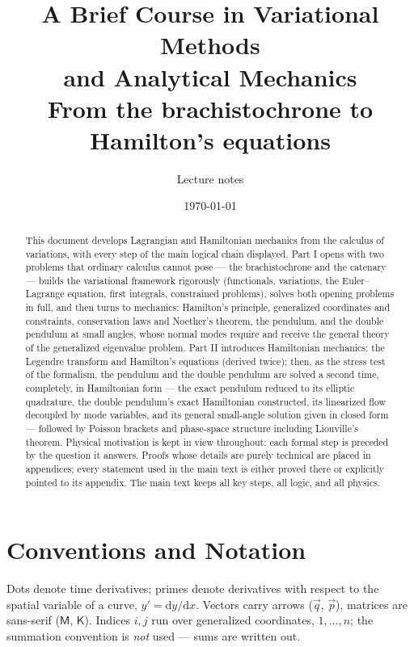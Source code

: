 \documentclass[11pt]{article}
\title{\bfseries A Brief Course in Variational Methods\\
and Analytical Mechanics\\[4pt]
\large From the brachistochrone to Hamilton's equations}
\author{Lecture notes}
\date{\today}
\theoremstyle{plain}
\theoremstyle{definition}
\theoremstyle{remark}
\newcommand{\dd}{\mathrm{d}}
\newcommand{\vq}{\vec{q}}
\newcommand{\vp}{\vec{p}}
\newcommand{\mM}{\mathsf{M}}
\newcommand{\mK}{\mathsf{K}}
\begin{document}
\maketitle

\begin{abstract}
\noindent
This document develops Lagrangian and Hamiltonian mechanics from the
calculus of variations, with every step of the main logical chain displayed.
Part I opens with two problems that ordinary calculus cannot pose --- the
brachistochrone and the catenary --- builds the variational framework
rigorously (functionals, variations, the Euler--Lagrange equation, first
integrals, constrained problems), solves both opening problems in full, and
then turns to mechanics: Hamilton's principle, generalized coordinates and
constraints, conservation laws and Noether's theorem, the pendulum, and the
double pendulum at small angles, whose normal modes require and receive the
general theory of the generalized eigenvalue problem. Part II introduces
Hamiltonian mechanics: the Legendre transform and Hamilton's equations
(derived twice); then, as the stress test of the formalism, the pendulum and
the double pendulum are solved a second time, completely, in Hamiltonian form
--- the exact pendulum reduced to its elliptic quadrature, the double
pendulum's exact Hamiltonian constructed, its linearized flow decoupled by
mode variables, and its general small-angle solution given in closed form ---
followed by Poisson brackets and phase-space structure including Liouville's
theorem. Physical motivation is kept in view throughout: each formal step is
preceded by the question it answers. Proofs whose details are purely technical are placed in appendices;
every statement used in the main text is either proved there or explicitly
pointed to its appendix. The main text keeps all key steps, all logic, and
all physics.
\end{abstract}

\clearpage
\tableofcontents
\clearpage

\section{Conventions and Notation}
\label{sec:conventions}

Dots denote time derivatives; primes denote derivatives with respect to the
spatial variable of a curve, $y' = \dd y/\dd x$. Vectors carry arrows
($\vq$, $\vp$), matrices are sans-serif ($\mM$, $\mK$). Indices $i, j$ run
over generalized coordinates, $1,\dots,n$; the summation convention is
\emph{not} used --- sums are written out.
\end{document}

